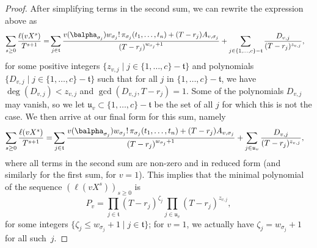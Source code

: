 \documentclass[12pt]{article}
\newcommand{\minpoly}{P}
\newcommand{\lf}{X}
\begin{document}
\begin{proof}
  After simplifying terms in the second sum, we can rewrite the
  expression above as
  \begin{align*}
    \sum_{s \ge 0} \frac{\ell(v \lf^s)}{T^{s+1}} =&
    \sum_{j \in \mathfrak{t}} \frac{
      v(\balpha_{\sigma_{j}})   w_{\sigma_{j}}!\, \pi_{{\sigma_{j}}}(t_1,\dots,t_n)
      + (T-r_{j} )A_{v,\sigma_{j}}}
	{(T-r_{j} )^{w_{\sigma_{j}}+1}}  
	+\sum_{j \in  \{1,\dots,c\}-\mathfrak{t}}
	\frac{D_{v,j}}
	     {(T-r_{j})^{z_{v,j}}},
  \end{align*}
  for some positive integers $\{z_{v,j} \mid j\in
  \{1,\dots,c\}-\mathfrak{t}\}$ and polynomials $\{D_{v,j} \mid j\in
  \{1,\dots,c\}-\mathfrak{t}\}$ such that for all $j$ in $
  \{1,\dots,c\}-\mathfrak{t}$, we have $\deg(D_{v,j}) < z_{v,j}$ and
  $\gcd(D_{v,j}, T-r_{j} )=1$. Some of the polynomials $D_{v,j}$ may
  vanish, so we let $\mathfrak{u}_v \subset
  \{1,\dots,c\}-\mathfrak{t}$ be the set of all $j$ for which this is
  not the case.  We then arrive at our final form for this sum, namely
  \begin{align}\label{eq:sumgenseries_collect1}
    \sum_{s \ge 0}  \frac{\ell(v \lf^s)}{T^{s+1}} =&
    \sum_{j \in \mathfrak{t}} \frac{
      v(\balpha_{\sigma_{j}})   w_{\sigma_{j}}!\, \pi_{{\sigma_{j}}}(t_1,\dots,t_n)
      + (T-r_{j}  )A_{v,\sigma_{j}}}
	{(T-r_{j} )^{w_{\sigma_{j}}+1}}  
	+\sum_{j \in  \mathfrak{u}_v}
	\frac{D_{v,j}}
	     {(T-r_{j} )^{z_{v,j}}},
  \end{align}
  where all terms in the second sum are non-zero and in reduced form
  (and similarly for the first sum, for $v=1$).
  This implies that the minimal
  polynomial of the sequence $(\ell(v\lf^s))_{s \ge 0}$ is 
  $$\minpoly_v=\prod_{j \in \mathfrak{t}} (T-r_{j})^{\zeta_j} \prod_{j
    \in \mathfrak{u}_v} (T-r_{j})^{z_{v,j}},$$
  for some integers $\{\zeta_j \le w_{\sigma_{j}}+1 \mid j \in \mathfrak{t}\}$; for $v=1$, 
  we actually have $\zeta_j = w_{\sigma_{j}}+1$ for all such~$j$.
	

\end{proof}
\end{document}
